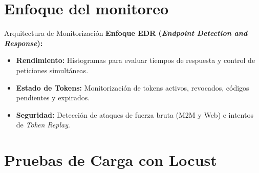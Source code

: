 \documentclass[10pt, aspectratio=169]{beamer}
\begin{document}
	\section{Enfoque del monitoreo}
	
	\begin{frame}{Arquitectura de Monitorización}
		\textbf{Enfoque EDR (\textit{Endpoint Detection and Response}):}
		\begin{itemize}
			\item \textbf{Rendimiento:} Histogramas para evaluar tiempos de respuesta y control de peticiones simultáneas.
			\item \textbf{Estado de Tokens:} Monitorización de tokens activos, revocados, códigos pendientes y expirados.
			\item \textbf{Seguridad:} Detección de ataques de fuerza bruta (M2M y Web) e intentos de \textit{Token Replay}.
		\end{itemize}
	\end{frame}
	
	\section{Pruebas de Carga con Locust}
	
\end{document}
